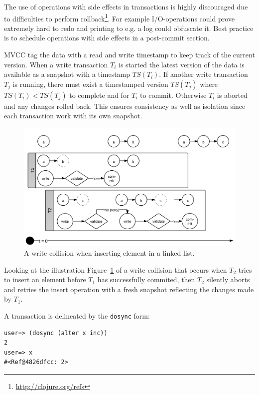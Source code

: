 \documentclass[a4paper,12pt]{kth-mag}
\begin{document}
The use of operations with side effects in transactions is highly discouraged due to difficulties to perform rollback\footnote{\url{http://clojure.org/refs}}. For example I/O-operations could prove extremely hard to redo and printing to e.g. a log could obfuscate it. Best practice is to schedule operations with side effects in a post-commit section.

MVCC tag the data with a read and write timestamp to keep track of the current version. When a write transaction $T_i$ is started the latest version of the data is available as a snapshot with a timestamp $TS(T_i)$. If another write transaction $T_j$ is running, there must exist a timestamped version $TS(T_j)$ where $TS(T_i) \lt TS(T_j)$ to complete and for $T_i$ to commit. Otherwise $T_i$ is aborted and any changes rolled back. This ensures consistency as well as isolation since each transaction work with its own snapshot.

\begin{figure}[H]
\centering
\includegraphics[scale=0.8]{images/TransactionWriteCollision.png}
\caption{A write collision when inserting element in a linked list.}
\label{fig:twc}
\end{figure}

Looking at the illustration Figure~\ref{fig:twc} of a write collision that occurs when $T_2$ tries to insert an element before $T_1$ has successfully commited, then $T_2$ silently aborts and retries the insert operation with a fresh snapshot reflecting the changes made by $T_1$.

A transaction is delineated by the \texttt{dosync} form:

\begin{listing}[H]
	\begin{verbatim}
user=> (dosync (alter x inc))
2
user=> x
#<Ref@4826dfcc: 2>
	\end{verbatim}
\end{listing}
\end{document}
